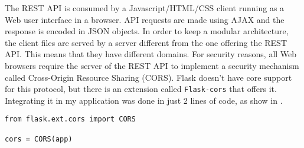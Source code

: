 The REST API is consumed by a Javascript/HTML/CSS client running as a Web user interface in a browser. API requests are made using AJAX and the response is encoded in JSON objects. In order to keep a modular architecture, the client files are served by a server different from the one offering the REST API. This means that they have different domains. For security reasons, all Web browsers require the server of the REST API to implement a security mechanism called Cross-Origin Resource Sharing (CORS). Flask doesn't have core support for this protocol, but there is an extension called \texttt{Flask-cors} that offers it. Integrating it in my application was done in just 2 lines of code, as show in .

\lstset{language=Python,caption=Adding CORS support to a Flask application, label=lst:flask-cors}
\begin{lstlisting}
from flask.ext.cors import CORS

cors = CORS(app)
\end{lstlisting}


